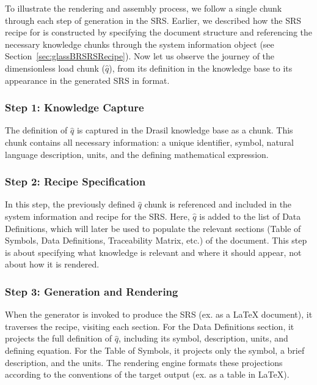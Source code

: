 To illustrate the rendering and assembly process, we follow a single chunk 
through each step of generation in the \gb{} SRS. Earlier, we 
described how the SRS recipe for \gb{} is constructed by specifying the 
document structure and referencing the necessary knowledge chunks through the 
system information object (see Section~\ref{sec:glassBRSRSRecipe}). Now let us 
observe the journey of the dimensionless load chunk ($\hat{q}$), from 
its definition in the knowledge base to its appearance in the generated SRS in 
 format.

\subsubsection{Step 1: Knowledge Capture}

The definition of $\hat{q}$ is captured in the Drasil knowledge base as a 
chunk. This chunk contains all necessary information: a unique identifier, 
symbol, natural language description, units, and the defining mathematical 
expression.


\subsubsection{Step 2: Recipe Specification}

In this step, the previously defined $\hat{q}$ chunk is referenced and included 
in the system information and recipe for the \gb{} SRS. Here, $\hat{q}$ is 
added to the list of Data Definitions, which will later be used to populate the 
relevant sections (Table of Symbols, Data Definitions, Traceability Matrix, 
etc.) of the document. This step is about specifying what 
knowledge is relevant and where it should appear, not about how it is rendered.

\subsubsection{Step 3: Generation and Rendering}
When the generator is invoked to produce the SRS (ex. as a \LaTeX{} document), 
it traverses the recipe, visiting each section. For the Data Definitions 
section, it projects the full definition of $\hat{q}$, including its symbol, 
description, units, and defining equation. For the Table of Symbols, it 
projects only the symbol, a brief description, and the units. The rendering 
engine formats these projections according to the conventions of the target 
output (ex. as a table in \LaTeX{}).

